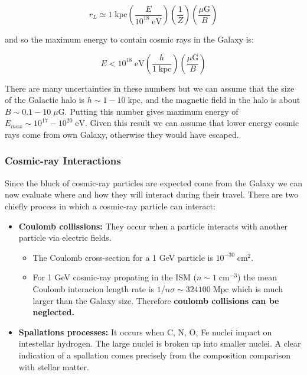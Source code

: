 \documentclass[
  letterpaper,
  DIV=11,
  numbers=noendperiod]{scrreprt}
\providecommand{\tightlist}{%
  \setlength{\itemsep}{0pt}\setlength{\parskip}{0pt}}\usepackage{longtable,booktabs,array}
\begin{document}
\[r_L \simeq  1 \;\mathrm{kpc} \left(\frac{E}{10^{18}\;\mathrm{eV}}\right)\left(\frac{1}{Z}\right)\left(\frac{\mu\mathrm{G}}{B}\right)\]

and so the maximum energy to contain cosmic rays in the Galaxy is:

\[ E < 10^{18}\;\mathrm{eV} \left(\frac{h}{1\;\mathrm{kpc}}\right)\left(\frac{\mu\mathrm{ G}}{B}\right)\]

There are many uncertainties in these numbers but we can assume that the
size of the Galactic halo is \(h \sim 1 - 10\; \mathrm{kpc}\), and the
magnetic field in the halo is about \(B \sim 0.1 - 10 \;\mu\mathrm{G}\).
Putting this number gives maximum energy of
\(E_{max} \sim 10^{17} - 10^{20} \;\mathrm{eV}\). Given this result we
can assume that lower energy cosmic rays come from own Galaxy, otherwise
they would have escaped.

\subsubsection*{Cosmic-ray Interactions}\label{cosmic-ray-interactions}

Since the bluck of cosmic-ray particles are expected come from the
Galaxy we can now evaluate where and how they will interact during their
travel. There are two chiefly process in which a cosmic-ray particle can
interact:

\begin{itemize}
\tightlist
\item
  \textbf{Coulomb collissions:} They occur when a particle interacts
  with another particle via electric fields.

  \begin{itemize}
  \tightlist
  \item
    The Coulomb cross-section for a 1 GeV particle is
    \(10^{-30} \; \mathrm{cm}^2\).
  \item
    For 1 GeV cosmic-ray propating in the ISM
    (\(n \sim 1 \; \mathrm{cm}^{-3}\)) the mean Coulomb interacion
    length rate is \(1/n\sigma \sim 324100 \; \mathrm{Mpc}\) which is
    much larger than the Galaxy size. Therefore \textbf{coulomb
    collisions can be neglected.}
  \end{itemize}
\item
  \textbf{Spallations processes:} It occurs when C, N, O, Fe nuclei
  impact on intestellar hydrogen. The large nuclei is broken up into
  smaller nuclei. A clear indication of a spallation comes precisely
  from the composition comparison with stellar matter.
\end{itemize}
\end{document}
